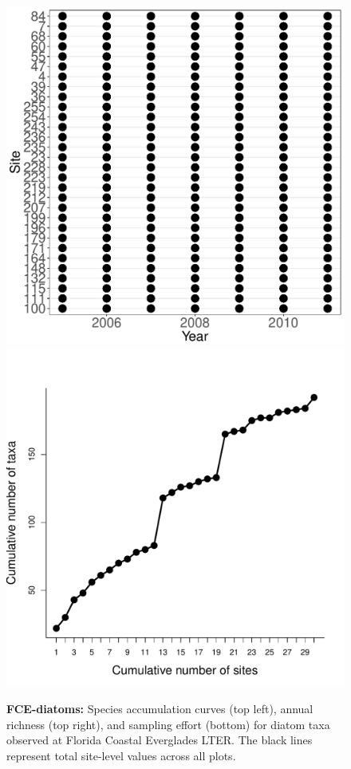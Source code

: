 \documentclass[11pt, oneside]{article}
\begin{document}
\begin{figure}[h!]
\includegraphics[scale = 0.4]{fce-diatoms-catano_spatiotemporal_sampling_effort.pdf}
\includegraphics[scale = 0.4]{fce-diatoms-catano_species_accumulation_space.pdf}
\caption{{\bf FCE-diatoms:} Species accumulation curves (top left),  annual richness (top right), and sampling effort (bottom)  for diatom taxa observed at  Florida Coastal Everglades LTER. The black lines represent total site-level values across all plots.}
\label{fce-diatoms}
\end{figure}
\end{document}

